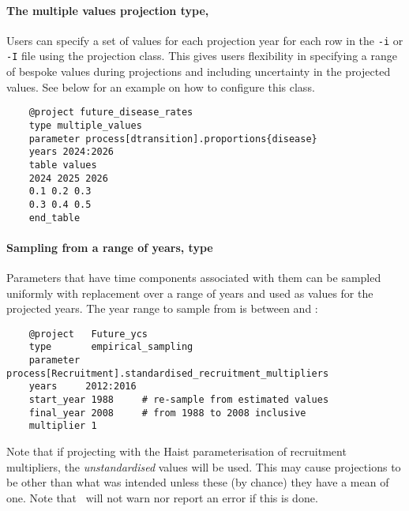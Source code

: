 \paragraph[Multiple Values]{The multiple values projection type, }\label{sec:Project-MultipleValues}

Users can specify a set of values for each projection year for each row in the \texttt{-i} or \texttt{-I} file using the  projection class. This gives users flexibility in specifying a range of bespoke values during projections and including uncertainty in the projected values. See below for an example on how to configure this class.

{\small{\begin{verbatim}
	@project future_disease_rates
	type multiple_values
	parameter process[dtransition].proportions{disease}  
	years 2024:2026
	table values
	2024 2025 2026
	0.1 0.2 0.3
	0.3 0.4 0.5
	end_table
\end{verbatim}}}

\paragraph[Empirical sampling]{Sampling from a range of years, type  }\label{sec:Project-EmpiricalSampling}

Parameters that have time components associated with them can be sampled uniformly with replacement over a range of years and used as values for the projected years. The year range to sample from is between  and :

{\small{\begin{verbatim}
	@project   Future_ycs
	type       empirical_sampling
	parameter  process[Recruitment].standardised_recruitment_multipliers
	years     2012:2016
	start_year 1988     # re-sample from estimated values
	final_year 2008     # from 1988 to 2008 inclusive
	multiplier 1
\end{verbatim}}}

Note that if projecting  with the Haist parameterisation of recruitment multipliers, the \emph{unstandardised} values will be used. This may cause projections to be other than what was intended unless these (by chance) they have a mean of one. Note that \CNAME\ will not warn nor report an error if this is done. 

